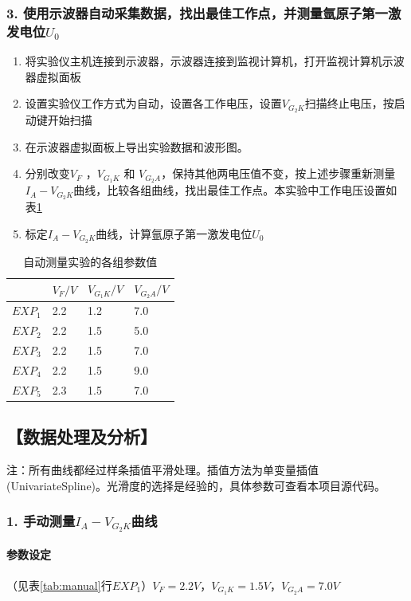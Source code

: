 \documentclass[12pt,a4paper,UTF8]{ctexart}
\begin{document}
	\subsubsection*{3. 使用示波器自动采集数据，找出最佳工作点，并测量氩原子第一激发电位$U_0$}
		\begin{enumerate}[label=\arabic*.]
			\item 将实验仪主机连接到示波器，示波器连接到监视计算机，打开监视计算机示波器虚拟面板
			\item 设置实验仪工作方式为自动，设置各工作电压，设置$V_{G_2K}$扫描终止电压，按启动键开始扫描
			\item 在示波器虚拟面板上导出实验数据和波形图。
			\item 分别改变$V_F$  ，$V_{G_1K}$ 和 $V_{G_2A}$，保持其他两电压值不变，按上述步骤重新测量$I_A-V_{G_2K}$曲线，比较各组曲线，找出最佳工作点。本实验中工作电压设置如表\ref{tab:auto}
			\item 标定$I_A-V_{G_2K}$曲线，计算氩原子第一激发电位$U_0$
		\end{enumerate}
		\begin{table}[htbp]
			\centering
			\begin{tabular}{|l|l|l|l|}
			\hline
				& $V_F/V$ & $V_{G_1K}/V$ & $V_{G_2A}/V$ \\ \hline
				$EXP_1$ & 2.2 & 1.2 & 7.0 \\ \hline
				$EXP_2$ & 2.2 & 1.5 & 5.0 \\ \hline
				$EXP_3$ & 2.2 & 1.5 & 7.0 \\ \hline
				$EXP_4$ & 2.2 & 1.5 & 9.0 \\ \hline
				$EXP_5$ & 2.3 & 1.5 & 7.0 \\ \hline
			\end{tabular}
			\caption{自动测量实验的各组参数值}
			\label{tab:auto}
		\end{table}

\subsection*{【数据处理及分析】}
注：所有曲线都经过样条插值平滑处理。插值方法为单变量插值(UnivariateSpline)。光滑度的选择是经验的，具体参数可查看本项目源代码。
	\subsubsection*{1. 手动测量$I_A-V_{G_2K}$曲线}
		\paragraph{参数设定}（见表\ref{tab:manual}行$EXP_1$）$V_F=2.2V$，$V_{G_1K}=1.5V$，$V_{G_2A}=7.0V$
\end{document}
